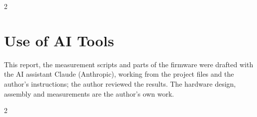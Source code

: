 \documentclass[
	a4paper,english
]{MFETechnicalReport}
\begin{document}
\begin{multicols}{2}
\section*{Use of AI Tools}
This report, the measurement scripts and parts of the firmware were drafted with the AI assistant Claude (Anthropic), working from the project files and the author's instructions; the author reviewed the results. The hardware design, assembly and measurements are the author's own work.

	\end{multicols}

	\begin{multicols}{2}
		\printbibliography[title=References]
	\end{multicols}

	\newpage
	
\end{document}
